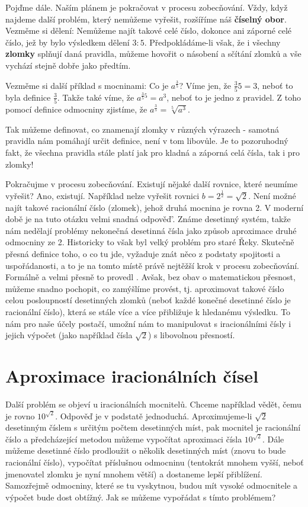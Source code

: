     Pojďme dále. Naším plánem je pokračovat v procesu zobecňování. Vždy, když najdeme další
    problém, který nemůžeme vyřešit, rozšíříme náš \textbf{číselný obor}. Vezměme si dělení:
    Nemůžeme najít takové celé číslo, dokonce ani záporné celé číslo, jež by bylo výsledkem dělení
    \(3:5\). Předpokládáme-li však, že i všechny \textbf{zlomky} splňují daná pravidla, můžeme
    hovořit o násobení a sčítání zlomků a vše vychází stejně dobře jako předtím.

    Vezměme si další příklad s mocninami: Co je \(a^\frac{3}{5}\)? Víme jen, že \(\frac{3}{5}5=3\),
    neboť to byla deﬁnice \(\frac{3}{5}\). Takže také víme, že \(a^{\frac{3}{5}5}=a^3\), neboť to je
    jedno z pravidel. Z toho pomocí deﬁnice odmocniny zjistíme, že \(a^\frac{3}{5}=\sqrt[5]{a^3}\).
    
    Tak můžeme definovat, co znamenají zlomky v různých výrazech - samotná pravidla nám pomáhají
    určit deﬁnice, není v tom libovůle. Je to pozoruhodný fakt, že všechna pravidla stále platí jak
    pro kladná a záporná celá čísla, tak i pro zlomky!

    Pokračujme v procesu zobecňování. Existují nějaké další rovnice, které neumíme vyřešit? Ano,
    existují. Například nelze vyřešit rovnici \(b=2^\frac{1}{2} =\sqrt{2}\). Není možné najít takové
    racionální číslo (zlomek), jehož druhá mocnina je rovna 2. V moderní době je na tuto otázku
    velmi snadná odpověď'. Známe desetinný systém, takže nám nedělají problémy nekonečná desetinná
    čísla jako způsob aproximace druhé odmocniny ze 2. Historicky to však byl velký problém pro
    staré Řeky. Skutečně přesná deﬁnice toho, o co tu jde, vyžaduje znát něco z podstaty spojitosti
    a uspořádanosti, a to je na tomto místě právě nejtěžší krok v procesu zobecňování. Formálně a
    velmi přesně to provedl \RichardDedekind. Avšak, bez obav o matematickou přesnost, můžeme snadno
    pochopit, co zamýšlíme provést, tj. aproximovat takové číslo celou posloupností desetinných
    zlomků (neboť každé konečné desetinné číslo je racionální číslo), která se stále více a více
    přibližuje k hledanému výsledku. To nám pro naše účely postačí, umožní nám to manipulovat s
    iracionálními čísly i jejich výpočet (jako například čísla \(\sqrt{2}\)) s libovolnou přesností.

  \section{Aproximace iracionálních čísel}\label{fyz:IchapXXIIsecIV}
    Další problém se objeví u iracionálních mocnitelů. Chceme například vědět, čemu je rovno
    \(10^{\sqrt{2}}\). Odpověď je v podstatě jednoduchá. Aproximujeme-li \(\sqrt{2}\) desetinným
    číslem s určitým počtem desetinných míst, pak mocnitel je racionální číslo a předcházející
    metodou můžeme vypočítat aproximaci čísla \(10^{\sqrt{2}}\). Dále můžeme desetinné číslo
    prodloužit o několik desetinných míst (znovu to bude racionální číslo), vypočítat příslušnou
    odmocninu (tentokrát mnohem vyšší, neboť jmenovatel zlomku je nyní mnohem větší) a dostaneme
    lepší přiblížení. Samozřejmě odmocniny, které se tu vyskytnou, budou mít vysoké odmocnitele a
    výpočet bude dost obtížný. Jak se můžeme vypořádat s tímto problémem?
  
